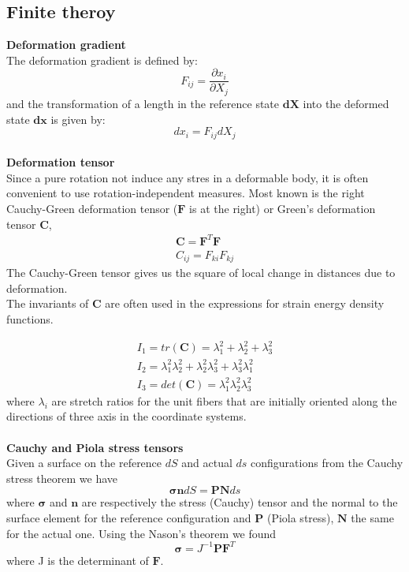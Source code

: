 \documentclass[12pt,a4paper]{article}
\numberwithin{equation}{section}
\begin{document}
\subsection{Finite theroy}
{\bf Deformation gradient}\\
The deformation gradient is defined by:
\begin{equation}
F_{ij}  = \frac{\partial x_i}{\partial X_j}
\end{equation}
and the transformation of a length in the reference state $\mathbf{dX}$ into the deformed state $\mathbf{dx}$ is given by: 
\begin{equation} %
d x_i = F_{ij}  d X_j 
\end{equation}
\\
{\bf Deformation tensor}\\
Since a pure rotation  not induce any stres in a deformable body, it is often convenient to use rotation-independent measures. Most known is the right Cauchy-Green deformation tensor  ($\mathbf{F}$ is at the right) or Green's deformation tensor $\mathbf{C}$,
\begin{align} %
\mathbf{C} = \mathbf{F}^T \mathbf{F} \\
C_{ij}  = F_{ki}  F_{kj}  \nonumber
\end{align}
The Cauchy-Green tensor gives us the square of local change in distances due to deformation.\\
The invariants of ${\mathbf  {C}}$ are often used in the expressions for strain energy density functions. 

\begin{align*} %
I_1 = tr({\mathbf  {C}}) = \lambda^2_1+ \lambda^2_2+ \lambda^2_3 \\
I_2 =  \lambda^2_1 \lambda^2_2 +  \lambda^2_2 \lambda^2_3 +  \lambda^2_3  \lambda^2_1 \\
I_3 =  det({\mathbf  {C}}) = \lambda^2_1 \lambda^2_2 \lambda^2_3
\end{align*}
where  $\lambda_{i}$ are stretch ratios for the unit fibers that are initially oriented along the directions of three axis in the coordinate systems.\\
\\
{\bf Cauchy and Piola stress tensors}\\
Given a surface on the reference $dS$ and actual $ds$ configurations from the Cauchy stress theorem we have
\begin{equation} 
\mathbf{\sigma} \mathbf{n} dS = \mathbf{P} \mathbf{N} ds 
\end{equation}
where $\mathbf{\sigma}$ and $\mathbf{n}$ are respectively the stress (Cauchy) tensor and the normal to the surface element for the reference configuration and $\mathbf{P}$ (Piola stress), $\mathbf{N}$ the same for the actual one.
Using the Nason's theorem we found
\begin{equation} 
\mathbf{\sigma} = J^{-1} \mathbf{P} \mathbf{F}^{T}
\end{equation}
where J is the determinant of $\mathbf{F}$.\\
\end{document}
